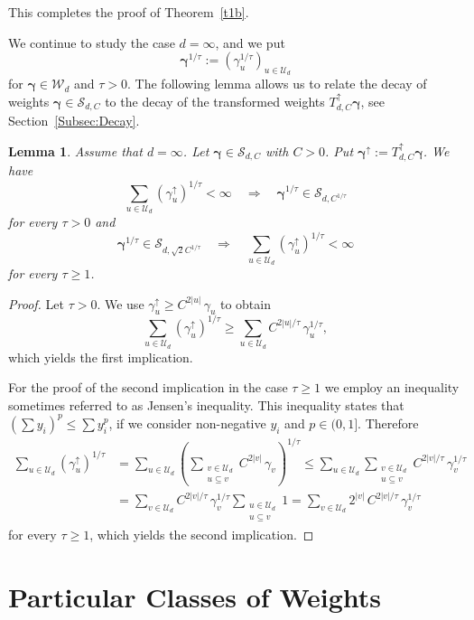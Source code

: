 \documentclass{article}
\newcommand{\bg}{{\boldsymbol{\gamma}}}
\newcommand{\U}  {\mathcal{U}}
\newcommand{\W}  {\mathcal{W}}
\newcommand{\SSS}{\mathcal{S}}
\newcommand{\up}{\uparrow}
\theoremstyle{plain}
\newtheorem{lemma}{Lemma}
\theoremstyle{definition}
\begin{document}
This completes the proof of Theorem~\ref{t1b}.

We continue to study the case $d=\infty$, and we put 
$$
\bg^{1/\tau} := (\gamma_u^{1/\tau})_{u \in \U_d}
$$ 
for $\bg \in \W_d$ and $\tau > 0$. 
The following lemma allows us to
relate the decay of weights 
$\bg \in \SSS_{d,C}$ to the decay of 
the transformed weights
$T^\up_{d,C} \bg$, see Section~\ref{Subsec:Decay}.

\begin{lemma}\label{l3}
Assume that $d=\infty$. Let $\bg \in \SSS_{d,C}$ with 
$C>0$. Put $\bg^\up := T^\up_{d,C} \bg$. We have
\[
\sum_{u \in \U_d} \left(\gamma_u^\up\right)^{1/\tau} < \infty 
\quad \Rightarrow \quad
\bg^{1/\tau} \in \SSS_{d,C^{1/\tau}}
\]
for every $\tau > 0$ and
\[
\bg^{1/\tau} \in \SSS_{d, \sqrt{2} C^{1/\tau}}
\quad \Rightarrow \quad
\sum_{u \in \U_d} \left(\gamma_u^\up\right)^{1/\tau} < \infty 
\]
for every $\tau \geq 1$.
\end{lemma}

\begin{proof}
Let $\tau > 0$.
We use $\gamma_u^\up \ge C^{2|u|} \, \gamma_u$ to obtain
\[
\sum_{u\in \U_d} \left(\gamma^\up_u\right)^{1/\tau} 
\geq
\sum_{u\in\U_d} C^{2|u|/\tau}\, \gamma_u^{1/\tau},
\]
which yields the first implication. 

For the proof of the second implication in the case $\tau \ge 1$ 
we employ
an inequality sometimes referred to as Jensen's inequality. This inequality
states that $(\sum y_i)^p \le \sum y_i^p$, if we consider non-negative 
$y_i$ and $p\in {(0,1]}$. Therefore
\begin{align*}
\sum_{u\in \U_d} \left(\gamma^\up_u\right)^{1/\tau}
&= \sum_{u\in \U_d} 
\left(\sum_{\substack{v\in\U_d \\ u\subseteq v}} 
C^{2|v|}\, \gamma_v\right)^{1/\tau}
\le \sum_{u\in \U_d} 
\sum_{\substack{v\in\U_d \\ u\subseteq v}} 
C^{2|v|/\tau}\, \gamma_v^{1/\tau}\\
&= \sum_{v\in\U_d} C^{2|v|/\tau}\, \gamma_v^{1/\tau} 
\sum_{\substack{u\in\U_d \\ u\subseteq v}} 1
= \sum_{v\in\U_d} 2^{|v|}\, C^{2|v|/\tau}\, \gamma_v^{1/\tau}
\end{align*}
for every $\tau \geq 1$, which yields the second implication.
\end{proof}


\section{Particular Classes of Weights}
\label{SEC:Part_Weights}
\end{document}
